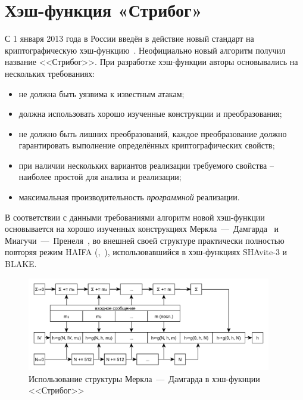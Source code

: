 \section{Хэш-функция «Стрибог»}

С 1 января 2013 года в России введён в действие новый стандарт на криптографическую хэш-функцию~\cite{GOST-2012}. Неофициально новый алгоритм получил название <<Стрибог>>. При разработке хэш-функции авторы основывались на нескольких требованиях:

\begin{itemize}
	\item не должна быть уязвима к известным атакам;
	\item должна использовать хорошо изученные конструкции и преобразования;
	\item не должно быть лишних преобразований, каждое преобразование должно гарантировать выполнение определённых криптографических свойств;
	\item при наличии нескольких вариантов реализации требуемого свойства -- наиболее простой для анализа и реализации;
	\item максимальная производительность \emph{программной} реализации.
\end{itemize}

В соответствии с данными требованиями алгоритм новой хэш-функции основывается на хорошо изученных конструкциях Меркла~---~Дамгарда~\cite{Merkle:1979, Merkle:1990, Damgard:1990} и Миагучи~---~Пренеля~\cite{Espen:Mieghem:1989, Miyaguchi:Ohta:Iwata:1990:03, Miyaguchi:Ohta:Iwata:1990:11}, во внешней своей структуре практически полностью повторяя режим HAIFA (,~\cite{Biham:Dunkelman:2007}), использовавшийся в хэш-функциях SHAvite-3 и BLAKE.

\begin{figure}[htb]
	\centering
	\includegraphics[width=0.95\textwidth]{pic/stribog-md}
  \caption{Использование структуры Меркла~---~Дамгарда в хэш-фукнции <<Стрибог>>}
  \label{fig:stribog-md}
\end{figure}

